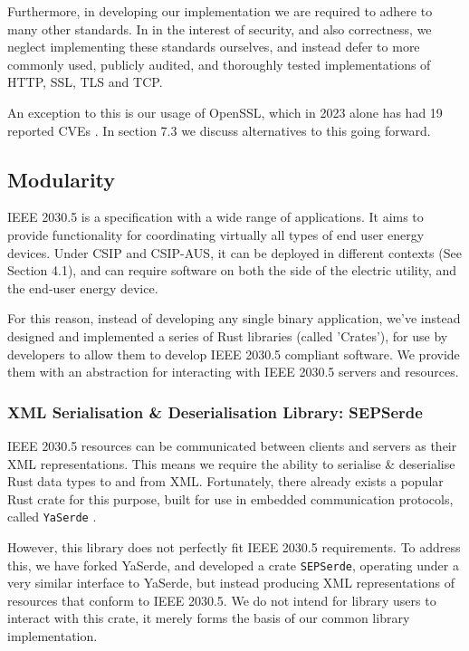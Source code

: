 Furthermore, in developing our implementation we are required to adhere to many other standards. In in the interest of security, and also correctness, we neglect implementing these standards ourselves, and instead defer to more commonly used, publicly audited, and thoroughly tested implementations of HTTP, SSL, TLS and TCP. 

An exception to this is our usage of OpenSSL, which in 2023 alone has had 19 reported CVEs \cite{OpensslCVE}. In section 7.3 we discuss alternatives to this going forward.

\subsection{Modularity}
IEEE 2030.5 is a specification with a wide range of applications. It aims to provide functionality for coordinating virtually all types of end user energy devices. Under CSIP and CSIP-AUS, it can be deployed in different contexts (See Section 4.1), and can require software on both the side of the electric utility, and the end-user energy device.

For this reason, instead of developing any single binary application, we've instead designed and implemented a series of Rust libraries (called 'Crates'), for use by developers to allow them to develop IEEE 2030.5 compliant software. We provide them with an abstraction for interacting with IEEE 2030.5 servers and resources.

\subsubsection{XML Serialisation \& Deserialisation Library: \- SEPSerde}
IEEE 2030.5 resources can be communicated between clients and servers as their XML representations. This means we require the ability to serialise \& deserialise Rust data types to and from XML.
Fortunately, there already exists a popular Rust crate for this purpose, built for use in embedded communication protocols, called \texttt{YaSerde} \cite[]{YaSerde}.

However, this library does not perfectly fit IEEE 2030.5 requirements. To address this, we have forked YaSerde, and developed a crate \texttt{SEPSerde}, operating under a very similar interface to YaSerde, but instead producing XML representations of resources that conform to IEEE 2030.5. We do not intend for library users to interact with this crate, it merely forms the basis of our common library implementation.

